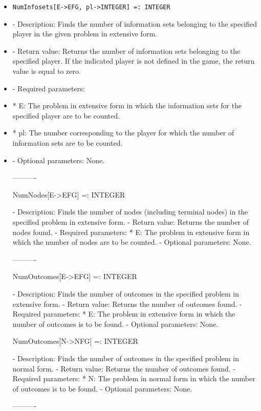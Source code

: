 \begin{itemize}
----------
\item
\begin{verbatim}
NumInfosets[E->EFG, pl->INTEGER] =: INTEGER
\end{verbatim}

\bd
\item
- Description:  Finds the number of information sets belonging to the
specified player in the given problem in extensive form.
\item
- Return value:  Returns the number of information sets belonging to
the specified player.  If the indicated player is not defined in the 
game, the return value is equal to zero.
\item
- Required parameters:

\bd
\item
*  E:  The problem in extensive form in which the information sets
for the specified player are to be counted.	  
\item
*  pl:  The number corresponding to the player for which the number 
of information sets are to be counted.
\ed
\item
 - Optional parameters:  None.
\ed

----------

NumNodes[E->EFG] =: INTEGER

   -	Description:  Finds the number of nodes (including terminal nodes) in 
	the specified problem in extensive form.
   -	Return value:  Returns the number of nodes found.
   -	Required parameters:
	  *  E:  The problem in extensive form in which the number of nodes are
		to be counted.
   -	Optional parameters:  None.

----------

NumOutcomes[E->EFG] =: INTEGER

   -	Description:  Finds the number of outcomes in the specified problem in
	extensive form.
   -	Return value:  Returns the number of outcomes found.
   -	Required parameters:
	  *  E:  The problem in extensive form in which the number of outcomes
		is to be found.
   -	Optional parameters:  None.


NumOutcomes[N->NFG] =: INTEGER

   -	Description:  Finds the number of outcomes in the specified problem in
	normal form.
   -	Return value:  Returns the number of outcomes found.
   -	Required parameters:
	  *  N:  The problem in normal form in which the number of outcomes is
		to be found.
   -	Optional parameters:  None.

----------


\end{itemize}
